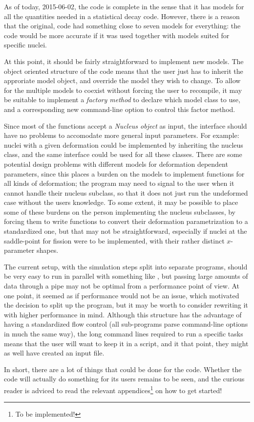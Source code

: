 As of today, 2015-06-02, the \codename{} code is complete in the sense that it has models for all the quantities needed in a statistical decay code.
However, there is a reason that the original,  code had something close to seven models for everything: the code would be more accurate if it was used together with models suited for specific nuclei.

At this point, it should be fairly straightforward to implement new models. The object oriented structure of the code means that the user just has to inherit the approriate model object, and override the model they wish to change. To allow for the multiple models to coexist without forcing the user to recompile, it may be suitable to implement a \emph{factory method} to declare which model class to use, and a corresponding new command-line option to control this factor method.

Since most of the functions accept a \emph{Nucleus object} as input, the interface should have no problems to accomodate more general input parameters. For example: nuclei with a given deformation could be implemented by inheriting the nucleus class, and the same interface could be used for all these classes. 
There are some potential design problems with different models for deformation dependent parameters, since this places a burden on the models to implement functions for all kinds of deformation; the program may need to signal to the user when it cannot handle their nucleus subclass, so that it does not just run the undeformed case without the users knowledge. To some extent, it may be possible to place some of these burdens on the person implementing the nucleus subclasses, by forcing them to write functions to convert their deformation parametrization to a standardized one, but that may not be straightforward, especially if nuclei at the saddle-point for fission were to be implemented, with their rather distinct $x$-parameter shapes.

The current setup, with the simulation steps split into separate programs, should be very easy to run in parallel with something like , but passing large amounts of data through a pipe may not be optimal from a performance point of view. At one point, it seemed as if performance would not be an issue, which motivated the decision to split up the program, but it may be worth to consider rewriting it with higher performance in mind. Although this structure has the advantage of having a standardized flow control (all sub-programs parse command-line options in much the same way), the long command lines required to run a specific tasks means that the user will want to keep it in a script, and it that point, they might as well have created an input file. 

In short, there are a lot of things that could be done for the code. 
Whether the code will actually do something for its users remains to be seen, and the curious reader is adviced to read the relevant appendices\footnote{To be implemented!} on how to get started!